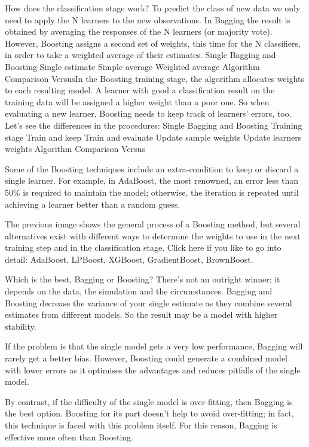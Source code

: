\documentclass[]{book}
\theoremstyle{definition}
\theoremstyle{definition}
\theoremstyle{definition}
\theoremstyle{remark}
\begin{document}
How does the classification stage work? To predict the class of new data
we only need to apply the N learners to the new observations. In Bagging
the result is obtained by averaging the responses of the N learners (or
majority vote). However, Boosting assigns a second set of weights, this
time for the N classifiers, in order to take a weighted average of their
estimates. Single Bagging and Boosting Single estimate Simple average
Weighted average Algorithm Comparison VersusIn the Boosting training
stage, the algorithm allocates weights to each resulting model. A
learner with good a classification result on the training data will be
assigned a higher weight than a poor one. So when evaluating a new
learner, Boosting needs to keep track of learners' errors, too. Let's
see the differences in the procedures: Single Bagging and Boosting
Training stage Train and keep Train and evaluate Update sample weights
Update learners weights Algorithm Comparison Versus

Some of the Boosting techniques include an extra-condition to keep or
discard a single learner. For example, in AdaBoost, the most renowned,
an error less than 50\% is required to maintain the model; otherwise,
the iteration is repeated until achieving a learner better than a random
guess.

The previous image shows the general process of a Boosting method, but
several alternatives exist with different ways to determine the weights
to use in the next training step and in the classification stage. Click
here if you like to go into detail: AdaBoost, LPBoost, XGBoost,
GradientBoost, BrownBoost.

Which is the best, Bagging or Boosting? There's not an outright winner;
it depends on the data, the simulation and the circumstances. Bagging
and Boosting decrease the variance of your single estimate as they
combine several estimates from different models. So the result may be a
model with higher stability.

If the problem is that the single model gets a very low performance,
Bagging will rarely get a better bias. However, Boosting could generate
a combined model with lower errors as it optimises the advantages and
reduces pitfalls of the single model.

By contrast, if the difficulty of the single model is over-fitting, then
Bagging is the best option. Boosting for its part doesn't help to avoid
over-fitting; in fact, this technique is faced with this problem itself.
For this reason, Bagging is effective more often than Boosting.
\end{document}
